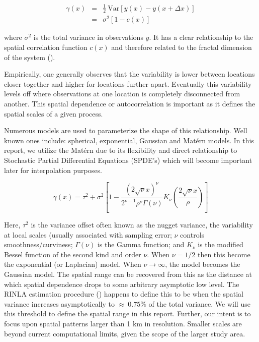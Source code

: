 \documentclass[letterpaper,portrait,11pt]{scrartcl}
\numberwithin{equation}{section}		%
\numberwithin{figure}{section}		%
\numberwithin{table}{section}				%
\begin{document}
\begin{eqnarray*}
\label{eq:semivariogram}
\gamma(x) &=& \frac{1}{2} \ \textrm{Var} [ y(x) - y(x + \Delta x)]  \\
&=& \sigma^2 [1-c(x)] 
\end{eqnarray*}

where $\sigma^2$ is the total variance in observations $y$. It has a clear relationship to the spatial correlation function $c(x)$ and therefore related to the fractal dimension of the system (\cite{fractals2002}). 

Empirically, one generally observes that the variability is lower between locations closer together and higher for locations further apart. Eventually this variability levels off where observations at one location is completely disconnected from another. This spatial dependence or autocorrelation is important as it defines the spatial scales of a given process. 

Numerous models are used to parameterize the shape of this relationship. Well known ones include: spherical, exponential, Gaussian and Mat\'{e}rn models. In this report, we utilize the Mat\'{e}rn due to its flexibility and direct relationship to Stochastic Partial Differential Equations (SPDE's) which will become important later for interpolation purposes. 

\begin{equation}
\gamma(x) = \tau^2 + \sigma^2 [ 1 - \frac{{(2\sqrt{\nu}x)}^\nu}{2^{\nu-1} \rho^{\nu} \Gamma(\nu)}
 K_\nu(\frac{2\sqrt{\nu}x}{\rho} ) ]
\end{equation}

Here, $\tau^2$ is the variance offset often known as the nugget variance, the variability at local scales (usually associated with sampling error; $\nu$ controls smoothness/curviness; $\Gamma(\nu)$ is the Gamma function; and $K_{\nu}$ is the modified Bessel function of the second kind and order $\nu$. When $\nu=1/2$ then this become the exponential (or Laplacian) model. When $\nu \longrightarrow \infty$, the model becomes the Gaussian model. The spatial range can be recovered from this as the distance at which spatial dependence drops to some arbitrary asymptotic low level. The RINLA estimation procedure (\cite{rinla}) happens to define this to be when the spatial variance increases asymptotically to $\approx~0.75\%$ of the total variance. We will use this threshold to define the spatial range in this report. Further, our intent is to focus upon spatial patterns larger than 1 km in resolution. Smaller scales are beyond current computational limits, given the scope of the larger study area.
\end{document}
